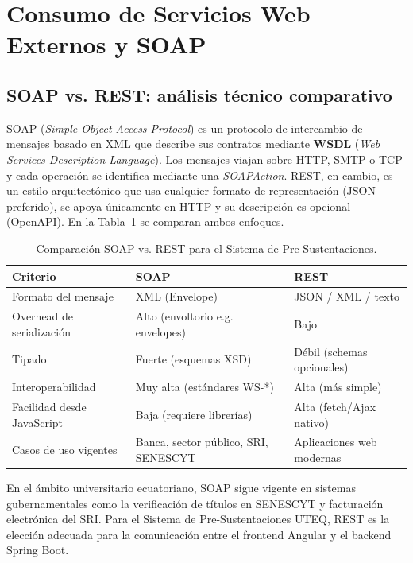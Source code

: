 \section{Consumo de Servicios Web Externos y SOAP}
\subsection{SOAP vs. REST: análisis técnico comparativo}

SOAP (\textit{Simple Object Access Protocol}) es un protocolo de intercambio de mensajes basado en XML que describe
sus contratos mediante \textbf{WSDL} (\textit{Web Services Description Language}). Los mensajes viajan sobre HTTP,
SMTP o TCP y cada operación se identifica mediante una \textit{SOAPAction}. REST, en cambio, es un estilo
arquitectónico que usa cualquier formato de representación (JSON preferido), se apoya únicamente en HTTP y su
descripción es opcional (OpenAPI). En la Tabla~\ref{tab:soap} se comparan ambos enfoques.

\begin{table}[H]
\centering
\small
\setlength{\tabcolsep}{5pt}
\begin{tabular}{@{}p{3.2cm}p{4.6cm}p{4.6cm}@{}}
\toprule
\textbf{Criterio} & \textbf{SOAP} & \textbf{REST} \\
\midrule
Formato del mensaje & XML (Envelope) & JSON / XML / texto \\
Overhead de serialización & Alto (envoltorio e.g. envelopes) & Bajo \\
Tipado & Fuerte (esquemas XSD) & Débil (schemas opcionales) \\
Interoperabilidad & Muy alta (estándares WS-*) & Alta (más simple) \\
Facilidad desde JavaScript & Baja (requiere librerías) & Alta (fetch/Ajax nativo) \\
Casos de uso vigentes & Banca, sector público, SRI, SENESCYT & Aplicaciones web modernas \\
\bottomrule
\end{tabular}
\caption{Comparación SOAP vs. REST para el Sistema de Pre-Sustentaciones.}
\label{tab:soap}
\end{table}

En el ámbito universitario ecuatoriano, SOAP sigue vigente en sistemas gubernamentales como la verificación de
títulos en SENESCYT y facturación electrónica del SRI. Para el Sistema de Pre-Sustentaciones UTEQ, REST es la
elección adecuada para la comunicación entre el frontend Angular y el backend Spring Boot.

